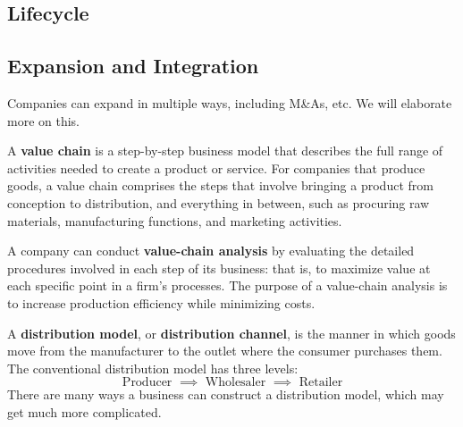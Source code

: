 \documentclass{article}
\begin{document}
    \begin{definition}[Operations]
      
    \end{definition}

  \subsection{Lifecycle}


  \subsection{Expansion and Integration}

    Companies can expand in multiple ways, including M\&As, etc. We will elaborate more on this. 

    \begin{definition}
      A \textbf{value chain} is a step-by-step business model that describes the full range of activities needed to create a product or service. For companies that produce goods, a value chain comprises the steps that involve bringing a product from conception to distribution, and everything in between, such as procuring raw materials, manufacturing functions, and marketing activities. 

      A company can conduct \textbf{value-chain analysis} by evaluating the detailed procedures involved in each step of its business: that is, to maximize value at each specific point in a firm's processes. The purpose of a value-chain analysis is to increase production efficiency while minimizing costs. 
    \end{definition}

    \begin{definition}
      A \textbf{distribution model}, or \textbf{distribution channel}, is the manner in which goods move from the manufacturer to the outlet where the consumer purchases them. The conventional distribution model has three levels:
      \begin{equation}
        \text{Producer } \implies \text{ Wholesaler } \implies \text{ Retailer}
      \end{equation}
      There are many ways a business can construct a distribution model, which may get much more complicated. 
    \end{definition}
\end{document}
